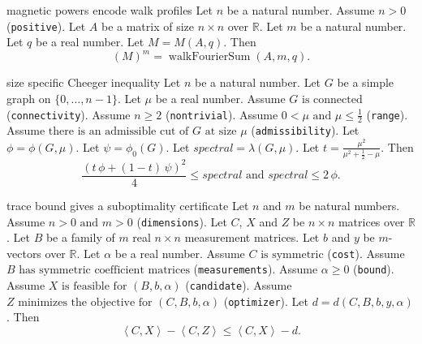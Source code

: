 \begin{cleanresult}{magnetic powers encode walk profiles}
Let $n$ be a natural number.
Assume $n > 0$ (\texttt{positive}).
Let $A$ be a matrix of size $n\times n$ over $\mathbb{R}$.
Let $m$ be a natural number.
Let $q$ be a real number.
Let $M = M(A,q)$.
Then \[\left(M\right)^{m} = \operatorname{walkFourierSum}(A,m,q).\]
\par{}
\end{cleanresult}

\begin{cleanresult}{size specific Cheeger inequality}
Let $n$ be a natural number.
Let $G$ be a simple graph on $\{0,\ldots,n-1\}$.
Let $\mu$ be a real number.
Assume $G\text{ is connected}$ (\texttt{connectivity}).
Assume $n \ge 2$ (\texttt{nontrivial}).
Assume $0 < \mu \text{ and } \mu \le \frac{1}{2}$ (\texttt{range}).
Assume $\text{there is an admissible cut of }G\text{ at size }\mu$ (\texttt{admissibility}).
Let $\phi = \phi(G,\mu)$.
Let $\psi = \phi_0(G)$.
Let $\mathit{spectral} = \lambda(G,\mu)$.
Let $t = \frac{{\mu}^{2}}{{\mu}^{2} + \frac{1}{2} - \mu}$.
Then \[\frac{{(t \, \phi + (1 - t) \, \psi)}^{2}}{4} \le \mathit{spectral} \text{ and } \mathit{spectral} \le 2 \, \phi.\]
\par{}
\end{cleanresult}

\begin{cleanresult}{trace bound gives a suboptimality certificate}
Let $n$ and $m$ be natural numbers.
Assume $n > 0 \text{ and } m > 0$ (\texttt{dimensions}).
Let $C$, $X$ and $Z$ be $n\times n$ matrices over $\mathbb{R}$.
Let $B$ be a family of $m$ real $n\times n$ measurement matrices.
Let $b$ and $y$ be $m$-vectors over $\mathbb{R}$.
Let $\alpha$ be a real number.
Assume $C\text{ is symmetric}$ (\texttt{cost}).
Assume $B\text{ has symmetric coefficient matrices}$ (\texttt{measurements}).
Assume $\alpha \ge 0$ (\texttt{bound}).
Assume $X\text{ is feasible for }(B,b,\alpha)$ (\texttt{candidate}).
Assume $Z\text{ minimizes the objective for }(C,B,b,\alpha)$ (\texttt{optimizer}).
Let $d = d(C,B,b,y,\alpha)$.
Then \[\left\langle C,X\right\rangle - \left\langle C,Z\right\rangle \le \left\langle C,X\right\rangle - d.\]
\par{}
\end{cleanresult}

